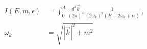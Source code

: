 \begin{align}
 I(E,m,\epsilon) &= \int^\Lambda_0 \frac{d^3\vec{k}}{(2\pi)^3} \frac{1}{(2\omega_k)^2(E-2\omega_k+i\epsilon)}\,,\\
\omega_k &= \sqrt{|\vec{k}|^2+m^2}
\end{align}